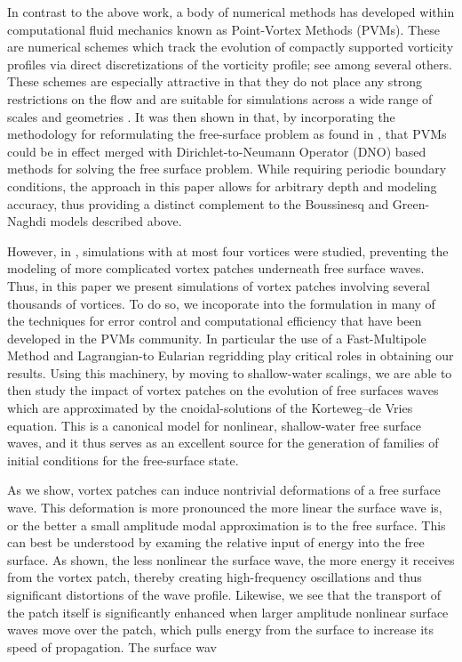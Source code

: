 \documentclass[a4paper,11pt]{article}
\begin{document}
In contrast to the above work, a body of numerical methods has developed within computational fluid mechanics known as Point-Vortex Methods (PVMs).  These are numerical schemes which track the evolution of compactly supported vorticity profiles via direct discretizations of the vorticity profile; see \cite{cottet,koumoutsakos,koumoutsakos2,krasny,beale,majda} among several others.  These schemes are especially attractive in that they do not place any strong restrictions on the flow and are suitable for simulations across a wide range of scales and geometries \cite{koumoutsakos3,koumoutsakos4}.  It was then shown in \cite{curtis} that, by incorporating the methodology for reformulating the free-surface problem as found in \cite{afm}, that PVMs could be in effect merged with Dirichlet-to-Neumann Operator (DNO) based methods \cite{craig,guyenne} for solving the free surface problem.  While requiring periodic boundary conditions, the approach in this paper allows for arbitrary depth and modeling accuracy, thus providing a distinct complement to the Boussinesq and Green-Naghdi models described above.

However, in \cite{curtis}, simulations with at most four vortices were studied, preventing the modeling of more complicated vortex patches underneath free surface waves.  Thus, in this paper we present simulations of vortex patches involving several thousands of vortices.  To do so, we incoporate into the formulation in \cite{curtis} many of the techniques for error control and computational efficiency that have been developed in the PVMs community.  In particular the use of a Fast-Multipole Method \cite{greengard} and Lagrangian-to Eularian regridding \cite{koumoutsakos} play critical roles in obtaining our results.  Using this machinery, by moving to shallow-water scalings, we are able to then study the impact of vortex patches on the evolution of free surfaces waves which are approximated by the cnoidal-solutions of the Korteweg--de Vries equation.  This is a canonical model for nonlinear, shallow-water free surface waves, and it thus serves as an excellent source for the generation of families of initial conditions for the free-surface state.  

As we show, vortex patches can induce nontrivial deformations of a free surface wave.  This deformation is more pronounced the more linear the surface wave is, or the better a small amplitude modal approximation is to the free surface.  This can best be understood by examing the relative input of energy into the free surface.  As shown, the less nonlinear the surface wave, the more energy it receives from the vortex patch, thereby creating high-frequency oscillations and thus significant distortions of the wave profile.  Likewise, we see that the transport of the patch itself is significantly enhanced when larger amplitude nonlinear surface waves move over the patch, which pulls energy from the surface to increase its speed of propagation.  The surface wav      
\end{document}
